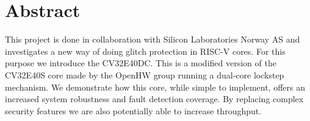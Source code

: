 \chapter{Abstract}




This project is done in collaboration with Silicon Laboratories Norway AS and investigates a new way of doing glitch protection in RISC-V cores. For this purpose we introduce the CV32E40DC. This is a modified version of the CV32E40S core made by the OpenHW group\cite{cv32e40s_manual} running a dual-core lockstep mechanism. We demonstrate how this core, while simple to implement, offers an increased system robustness and fault detection coverage. By replacing complex security features we are also potentially able to increase throughput. 


